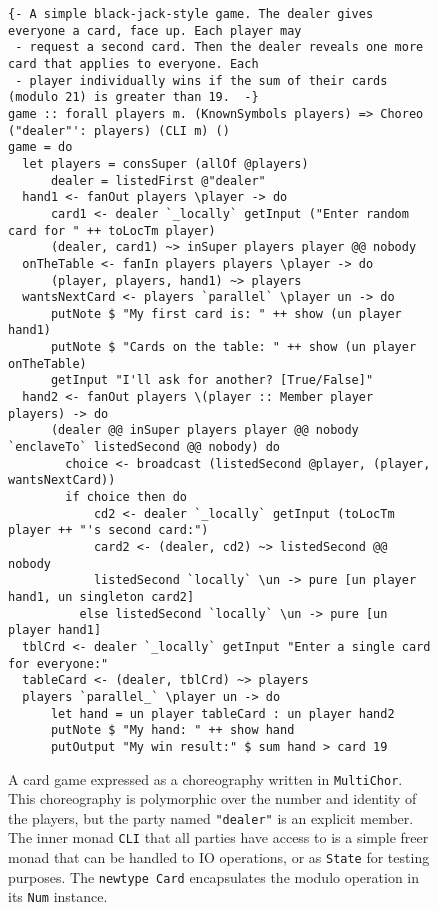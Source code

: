 \documentclass[sigplan,screen,review,anonymous]{acmart}
\newcommand{\inlinecode}[2][haskell]{\texttt{#2}}
\newcommand{\MultiChor}{\texttt{Multi\-Chor}\xspace}
\begin{document}
\begin{figure*}[tbhp]
    \begin{mdframed}
\begin{verbatim}
{- A simple black-jack-style game. The dealer gives everyone a card, face up. Each player may
 - request a second card. Then the dealer reveals one more card that applies to everyone. Each
 - player individually wins if the sum of their cards (modulo 21) is greater than 19.  -}
game :: forall players m. (KnownSymbols players) => Choreo ("dealer"': players) (CLI m) ()
game = do
  let players = consSuper (allOf @players)
      dealer = listedFirst @"dealer"
  hand1 <- fanOut players \player -> do
      card1 <- dealer `_locally` getInput ("Enter random card for " ++ toLocTm player)
      (dealer, card1) ~> inSuper players player @@ nobody
  onTheTable <- fanIn players players \player -> do
      (player, players, hand1) ~> players
  wantsNextCard <- players `parallel` \player un -> do
      putNote $ "My first card is: " ++ show (un player hand1)
      putNote $ "Cards on the table: " ++ show (un player onTheTable)
      getInput "I'll ask for another? [True/False]"
  hand2 <- fanOut players \(player :: Member player players) -> do
      (dealer @@ inSuper players player @@ nobody `enclaveTo` listedSecond @@ nobody) do
        choice <- broadcast (listedSecond @player, (player, wantsNextCard))
        if choice then do
            cd2 <- dealer `_locally` getInput (toLocTm player ++ "'s second card:")
            card2 <- (dealer, cd2) ~> listedSecond @@ nobody
            listedSecond `locally` \un -> pure [un player hand1, un singleton card2]
          else listedSecond `locally` \un -> pure [un player hand1]
  tblCrd <- dealer `_locally` getInput "Enter a single card for everyone:"
  tableCard <- (dealer, tblCrd) ~> players
  players `parallel_` \player un -> do
      let hand = un player tableCard : un player hand2
      putNote $ "My hand: " ++ show hand
      putOutput "My win result:" $ sum hand > card 19
\end{verbatim}
    \caption{A card game expressed as a choreography written in \MultiChor.
             This choreography is polymorphic over the number and identity of the players,
             but the party named \inlinecode{"dealer"} is an explicit member.
             The inner monad \inlinecode{CLI} that all parties have access to is a simple freer monad
             that can be handled to IO operations, or as \inlinecode{State} for testing purposes.
             The \inlinecode{newtype Card} encapsulates the modulo operation in its
             \inlinecode{Num} instance.}
    \label{fig:card-game}
    \end{mdframed}
\end{figure*}
\end{document}
